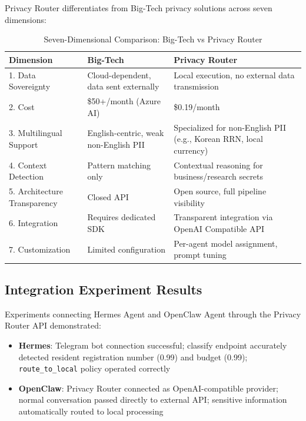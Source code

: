 \documentclass[11pt,a4paper]{article}
\begin{document}
Privacy Router differentiates from Big-Tech privacy solutions across seven dimensions:

\begin{table}[h]
\centering
\begin{tabular}{@{}p{2.5cm}p{4cm}p{4cm}@{}}
\toprule
Dimension & Big-Tech & Privacy Router \\
\midrule
1. Data Sovereignty & Cloud-dependent, data sent externally & Local execution, no external data transmission \\
2. Cost & \$50+/month (Azure AI) & \$0.19/month \\
3. Multilingual Support & English-centric, weak non-English PII & Specialized for non-English PII (e.g., Korean RRN, local currency) \\
4. Context Detection & Pattern matching only & Contextual reasoning for business/research secrets \\
5. Architecture Transparency & Closed API & Open source, full pipeline visibility \\
6. Integration & Requires dedicated SDK & Transparent integration via OpenAI Compatible API \\
7. Customization & Limited configuration & Per-agent model assignment, prompt tuning \\
\bottomrule
\end{tabular}
\caption{Seven-Dimensional Comparison: Big-Tech vs Privacy Router}
\end{table}

\subsection{Integration Experiment Results}

Experiments connecting Hermes Agent and OpenClaw Agent through the Privacy Router API demonstrated:

\begin{itemize}[nosep]
  \item \textbf{Hermes}: Telegram bot connection successful; classify endpoint accurately detected resident registration number (0.99) and budget (0.99); \texttt{route\_to_local} policy operated correctly
  \item \textbf{OpenClaw}: Privacy Router connected as OpenAI-compatible provider; normal conversation passed directly to external API; sensitive information automatically routed to local processing
\end{itemize}

\end{document}
